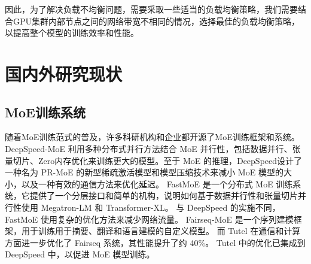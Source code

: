 因此，为了解决负载不均衡问题，需要采取一些适当的负载均衡策略，我们需要结合GPU集群内部节点之间的网络带宽不相同的情况，选择最佳的负载均衡策略，以提高整个模型的训练效率和性能。




\section{国内外研究现状}

\subsection{MoE训练系统}
随着MoE训练范式的普及，许多科研机构和企业都开源了MoE训练框架和系统。 
% 
DeepSpeed-MoE 利用多种分布式并行方法结合 MoE 并行性，包括数据并行、张量切片、Zero内存优化来训练更大的模型。至于 MoE 的推理，DeepSpeed设计了一种名为 PR-MoE 的新型稀疏激活模型和模型压缩技术来减小 MoE 模型的大小，以及一种有效的通信方法来优化延迟。 
% 
FastMoE 是一个分布式 MoE 训练系统，它提供了一个分层接口和简单的机构，说明如何基于数据并行性和张量切片并行性使用 Megatron-LM 和 Transformer-XL。
% 
与 DeepSpeed 的实施不同，FastMoE 使用复杂的优化方法来减少网络流量。
% 
Fairseq-MoE  是一个序列建模框架，用于训练用于摘要、翻译和语言建模的自定义模型。
% 
而 Tutel 在通信和计算方面进一步优化了 Fairseq 系统，其性能提升了约 40\%。
Tutel 中的优化已集成到 DeepSpeed 中，以促进 MoE 模型训练。

